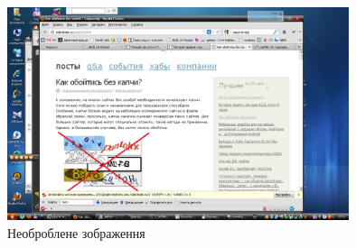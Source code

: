 \begin{figure}
\includegraphics[scale=1,width=10cm]{ap01-11.png}
\caption{Необроблене зображення}
\label{prsc-bad:image}
\end{figure}